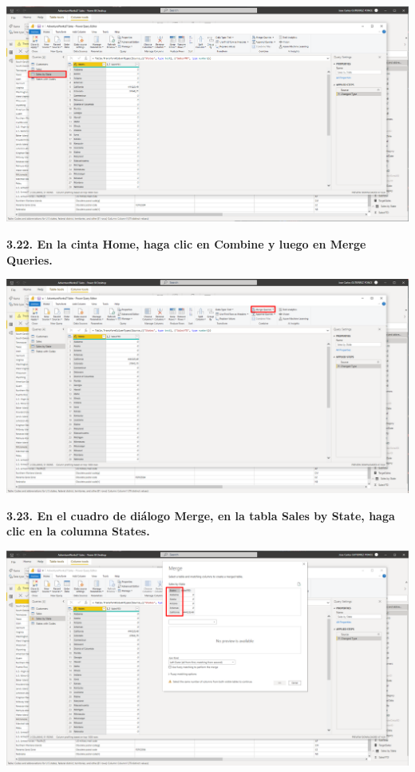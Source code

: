 \documentclass{article}
\begin{document}
    \begin{center}
		\includegraphics[width=14cm]{./images/69} 
	\end{center}

\textbf{3.22. En la cinta \textbf{Home}, haga clic en \textbf{Combine} y luego en \textbf{Merge Queries}.}

    \begin{center}
		\includegraphics[width=14cm]{./images/70} 
	\end{center}
\newpage
\textbf{3.23. En el cuadro de diálogo \textbf{Merge}, en la tabla \textbf{Sales by State}, haga clic en la columna \textbf{States}.}

    \begin{center}
		\includegraphics[width=14cm]{./images/71} 
	\end{center}
\end{document}
